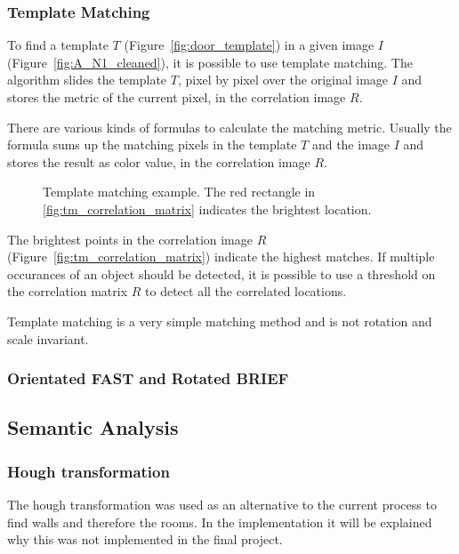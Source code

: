 \pagebreak
\subsubsection{Template Matching}
To find a template $T$ (Figure~\ref{fig:door_template}) in a given image $I$ (Figure~\ref{fig:A_N1_cleaned}), it is possible to use template matching. The algorithm slides the template $T$, pixel by pixel over the original image $I$ and stores the metric of the current pixel, in the correlation image $R$.

There are various kinds of formulas to calculate the matching metric. Usually the formula sums up the matching pixels in the template $T$ and the image $I$ and stores the result as color value, in the correlation image $R$.

\begin{figure}[h!]
	\centering
	\hfill
	\hfill
	\caption{Template matching example. The red rectangle in \ref{fig:tm_correlation_matrix} indicates the brightest location.}
	\label{fig:TemplateMatchingExample}
\end{figure}


The brightest points in the correlation image $R$ (Figure~\ref{fig:tm_correlation_matrix})  indicate the highest matches. If multiple occurances of an object should be detected, it is possible to use a threshold on the correlation matrix $R$ to detect all the correlated locations.

Template matching is a very simple matching method and is not rotation and scale invariant.

\subsubsection{Orientated FAST and Rotated BRIEF}

 
\subsection{Semantic Analysis}
\subsubsection{Hough transformation}
\label{subsubsec:Hough transformation}
The hough transformation was used as an alternative to the current process to find walls and therefore the rooms. In the implementation it will be explained why this was not implemented in the final project.

